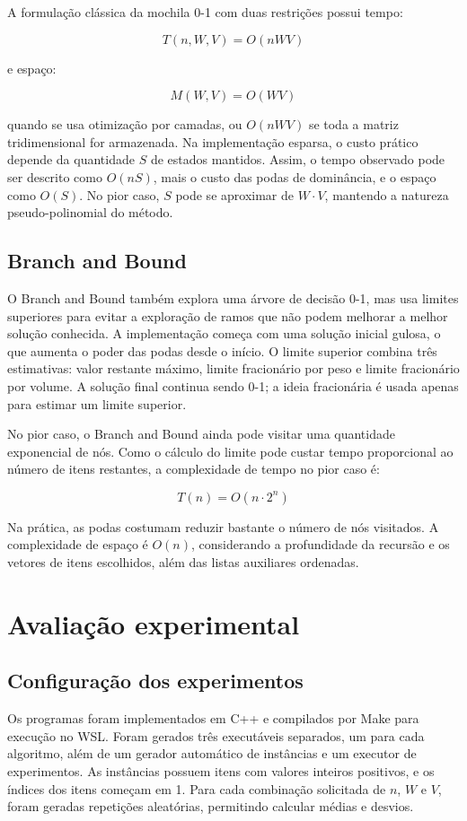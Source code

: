 \documentclass[
    12pt,
    oneside,
    a4paper,
    brazil,
    article
]{abntex2}
\begin{document}
A formulação clássica da mochila 0-1 com duas restrições possui tempo:

\[
T(n,W,V) = O(nWV)
\]

e espaço:

\[
M(W,V) = O(WV)
\]

quando se usa otimização por camadas, ou $O(nWV)$ se toda a matriz tridimensional for armazenada. Na implementação esparsa, o custo prático depende da quantidade $S$ de estados mantidos. Assim, o tempo observado pode ser descrito como $O(nS)$, mais o custo das podas de dominância, e o espaço como $O(S)$. No pior caso, $S$ pode se aproximar de $W \cdot V$, mantendo a natureza pseudo-polinomial do método.

\subsection{Branch and Bound}

O Branch and Bound também explora uma árvore de decisão 0-1, mas usa limites superiores para evitar a exploração de ramos que não podem melhorar a melhor solução conhecida. A implementação começa com uma solução inicial gulosa, o que aumenta o poder das podas desde o início. O limite superior combina três estimativas: valor restante máximo, limite fracionário por peso e limite fracionário por volume. A solução final continua sendo 0-1; a ideia fracionária é usada apenas para estimar um limite superior.

No pior caso, o Branch and Bound ainda pode visitar uma quantidade exponencial de nós. Como o cálculo do limite pode custar tempo proporcional ao número de itens restantes, a complexidade de tempo no pior caso é:

\[
T(n) = O(n \cdot 2^n)
\]

Na prática, as podas costumam reduzir bastante o número de nós visitados. A complexidade de espaço é $O(n)$, considerando a profundidade da recursão e os vetores de itens escolhidos, além das listas auxiliares ordenadas.

\section{Avaliação experimental}

\subsection{Configuração dos experimentos}

Os programas foram implementados em C++ e compilados por Make para execução no WSL. Foram gerados três executáveis separados, um para cada algoritmo, além de um gerador automático de instâncias e um executor de experimentos. As instâncias possuem itens com valores inteiros positivos, e os índices dos itens começam em 1. Para cada combinação solicitada de $n$, $W$ e $V$, foram geradas repetições aleatórias, permitindo calcular médias e desvios.
\end{document}
